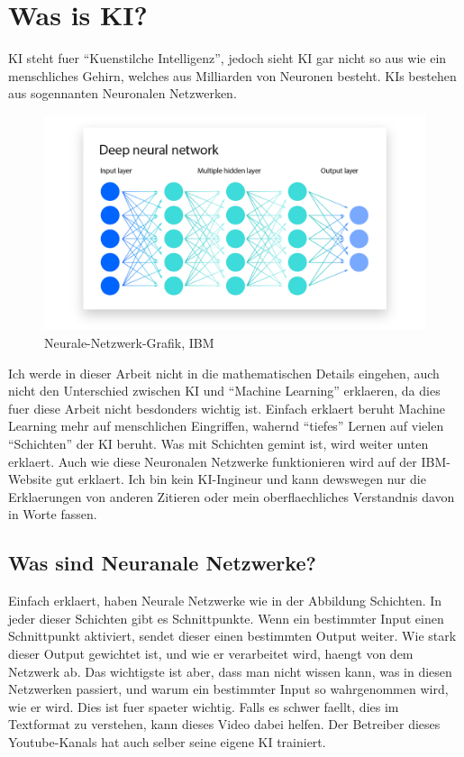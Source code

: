 \documentclass{report}
\begin{document}
\section{Was is KI?}
KI steht fuer \enquote{Kuenstilche Intelligenz}, jedoch sieht KI gar nicht so aus wie ein menschliches Gehirn, welches aus Milliarden von Neuronen besteht.
KIs bestehen aus sogennanten Neuronalen Netzwerken. \citep{neural-networks}
\begin{figure}[h]
    \centering 
    \includegraphics[width=1\textwidth]{NN-ibm.png} 
    \caption{Neurale-Netzwerk-Grafik, IBM}
    \label{fig:meme}
\end{figure}
\newline
Ich werde in dieser Arbeit nicht in die mathematischen Details eingehen, auch nicht den Unterschied zwischen KI und \enquote{Machine Learning} \citep{machine-learning-ibm} erklaeren, da dies fuer diese Arbeit nicht besdonders wichtig ist. Einfach erklaert beruht Machine Learning mehr auf menschlichen Eingriffen, wahernd \enquote{tiefes} Lernen auf vielen \enquote{Schichten} der KI beruht. Was mit Schichten gemint ist, wird weiter unten erklaert. Auch wie diese Neuronalen Netzwerke funktionieren wird auf der IBM-Website \citep{ai-ibm} gut erklaert. Ich bin kein KI-Ingineur und kann dewswegen nur die Erklaerungen von anderen Zitieren oder mein oberflaechliches Verstandnis davon in Worte fassen.
\subsection{Was sind Neuranale Netzwerke?}
Einfach erklaert, haben Neurale Netzwerke wie in der Abbildung Schichten. In jeder dieser Schichten gibt es Schnittpunkte. Wenn ein bestimmter Input einen Schnittpunkt aktiviert, sendet dieser einen bestimmten Output weiter. Wie stark dieser Output gewichtet ist, und wie er verarbeitet wird, haengt von dem Netzwerk ab.
Das wichtigste ist aber, dass man nicht wissen kann, was in diesen Netzwerken passiert, und warum ein bestimmter Input so wahrgenommen wird, wie er wird. Dies ist fuer spaeter wichtig.
\newline
Falls es schwer faellt, dies im Textformat zu verstehen, kann dieses Video \citep{how-ai-is-trained} dabei helfen. Der Betreiber dieses Youtube-Kanals hat auch selber seine eigene KI trainiert.
\end{document}
